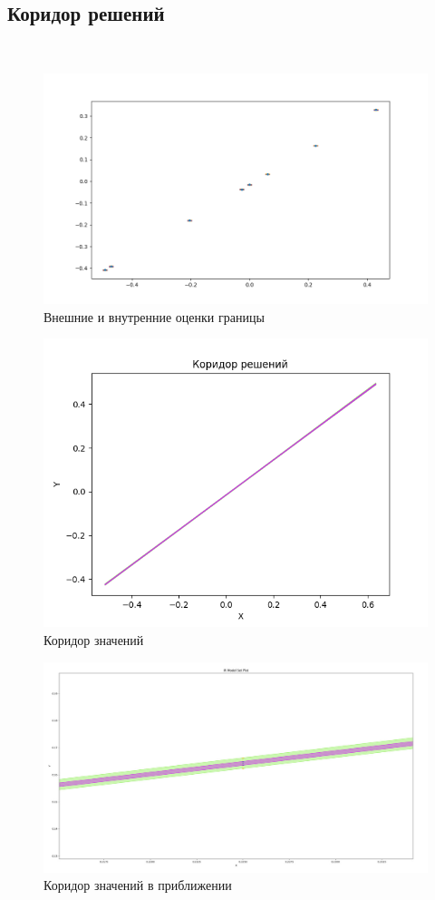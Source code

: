\documentclass[a4paper,12pt]{article}
\begin{document}
\subsection{Коридор решений}\\
\begin{figure}[h!]
    \centering
    \includegraphics[width=0.8\linewidth]{intervals.png}
    \caption{Внешние и внутренние оценки границы}
\end{figure}
\begin{figure}[h!]
    \centering
    \includegraphics[width=0.8\linewidth]{Коридоры.png}
    \caption{Коридор значений}
\end{figure}
\begin{figure}[h!]
    \centering
    \includegraphics[width=1\linewidth]{Корридор_приближенно.jpg}
    \caption{Коридор значений в приближении}
\end{figure}
\end{document}
